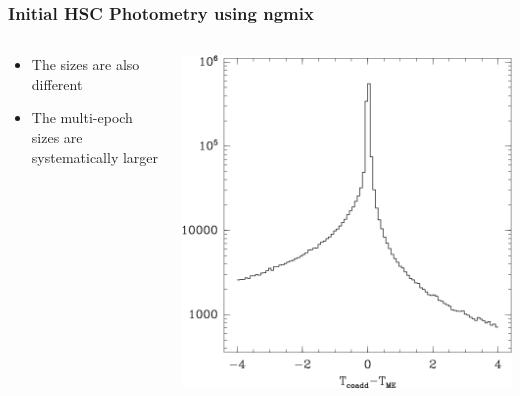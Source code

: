 \documentclass{beamer}
\begin{document}
\frame
{
    \frametitle{Initial HSC Photometry using ngmix}

 
    \begin{columns}
        \begin{column}{0.5\textwidth}
            \begin{itemize}

                \item The sizes are also different

                \item The multi-epoch sizes are systematically larger

            \end{itemize}
        \end{column}
        \begin{column}{0.5\textwidth}
            \includegraphics[width=\textwidth]{hsc-T-compare-diff.png}
        \end{column}
    \end{columns}
}
\end{document}
